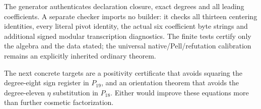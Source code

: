 The generator authenticates declaration closure, exact degrees and all
leading coefficients. A separate checker imports no builder: it checks
all thirteen centering identities, every literal pivot identity, the actual
six coefficient byte strings and additional signed modular transcription
diagnostics. The finite tests certify only the algebra and the data stated;
the universal native/Pell/refutation calibration remains an explicitly
inherited ordinary theorem.

The next concrete targets are a positivity certificate that avoids squaring
the degree-eight sign register in $P_{19}$, and an orientation theorem that
avoids the degree-eleven $\eta$ substitution in $P_{18}$. Either would
improve these equations more than further cosmetic factorization.
